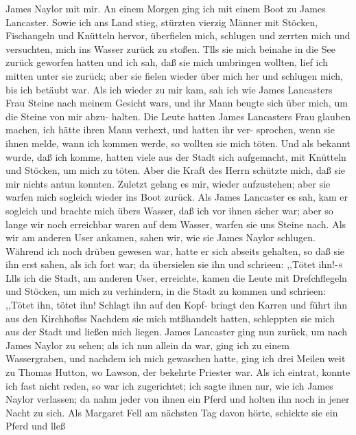 James Naylor mit mir. An einem Morgen ging ich mit einem
Boot zu James Lancaster. Sowie ich ans Land stieg, stürzten vierzig
Männer mit Stöcken, Fischangeln und Knütteln hervor, überfielen
mich, schlugen und zerrten mich und versuchten, mich ins Wasser zurück
zu stoßen. Tlls sie mich beinahe in die See zurück geworfen hatten
und ich sah, daß sie mich umbringen wollten, lief ich mitten unter sie
zurück; aber sie fielen wieder über mich her und schlugen mich,
bis ich betäubt war. Als ich wieder zu mir kam, sah ich wie
James Lancasters Frau Steine nach meinem Gesicht wars, und
ihr Mann beugte sich über mich, um die Steine von mir abzu-
halten. Die Leute hatten James Lancasters Frau glauben
machen, ich hätte ihren Mann verhext, und hatten ihr ver-
sprochen, wenn sie ihnen melde, wann ich kommen werde, so
wollten sie mich töten. Und als bekannt wurde, daß ich komme,
hatten viele aus der Stadt sich aufgemacht, mit Knütteln und
Stöcken, um mich zu töten. Aber die Kraft des Herrn
schützte mich, daß sie mir nichts antun konnten. Zuletzt gelang
es mir, wieder aufzustehen; aber sie warfen mich sogleich wieder
ins Boot zurück. Als James Lancaster es sah, kam er sogleich
und brachte mich übers Wasser, daß ich vor ihnen sicher war;
aber so lange wir noch erreichbar waren auf dem Wasser, warfen
sie uns Steine nach. Als wir am anderen User ankamen, sahen
wir, wie sie James Naylor schlugen. Während ich noch drüben
gewesen war, hatte er sich abseits gehalten, so daß sie ihn erst sahen,
als ich fort war; da übersielen sie ihn und schrieen: ,,Tötet ihn!-«
Llls ich die Stadt, am anderen User, erreichte, kamen die
Leute mit Drefchflegeln und Stöcken, um mich zu verhindern, in
die Stadt zu kommen und schrieen: ,,Tötet ihn, tötet ihn! Schlagt
ihn auf den Kopf- bringt den Karren und führt ihn aus den
Kirchhoflss Nachdem sie mich mtßhandelt hatten, schleppten sie
mich aus der Stadt und ließen mich liegen. James Lancaster
ging nun zurück, um nach James Naylor zu sehen; als ich nun
allein da war, ging ich zu einem Wassergraben, und nachdem ich
mich gewaschen hatte, ging ich drei Meilen weit zu Thomas
Hutton, wo Lawson, der bekehrte Priester war. Als ich eintrat,
konnte ich fast nicht reden, so war ich zugerichtet; ich sagte ihnen nur,
wie ich James Naylor verlassen; da nahm jeder von ihnen ein
Pferd und holten ihn noch in jener Nacht zu sich. Als Margaret
Fell am nächsten Tag davon hörte, schickte sie ein Pferd und lleß


